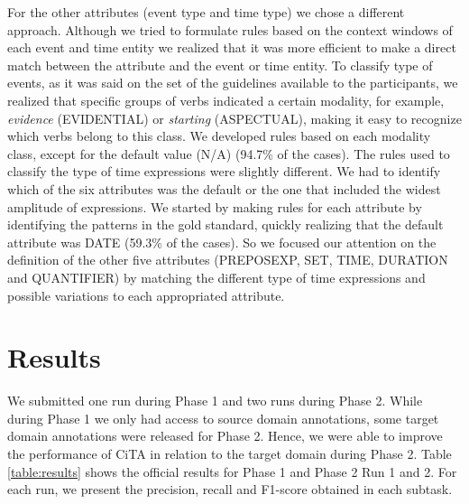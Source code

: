 \documentclass[11pt,a4paper]{article}
\begin{document}
For the other attributes (event type and time type) we chose a different approach. Although we tried to formulate rules based on the context windows of each event and time entity we realized that it was more efficient to make a direct match between the attribute and the event or time entity. 
To classify type of events, as it was said on the set of the guidelines available to the participants, we realized that specific groups of verbs indicated a certain modality, for example, \textit{evidence} (EVIDENTIAL) or \textit{starting} (ASPECTUAL), making it easy to recognize which verbs belong to this class. %
We developed rules based on each modality class, except for the default value (N/A) (94.7\% of the cases).
The rules used to classify the type of time expressions were slightly different.
We had to identify which of the six attributes was the default or the one that included the widest amplitude of expressions. 
We started by making rules for each attribute by identifying the patterns in the gold standard, quickly realizing that the default attribute was DATE (59.3\% of the cases). So we focused our attention on the definition of the other five attributes (PREPOSEXP, SET, TIME, DURATION and QUANTIFIER) by matching the different type of time expressions and possible variations to each appropriated attribute. 


\section{Results}

We submitted one run during Phase 1 and two runs during Phase 2.
While during Phase 1 we only had access to source domain annotations, some target domain annotations were released for Phase 2.
Hence, we were able to improve the performance of CiTA in relation to the target domain during Phase 2.
Table \ref{table:results} shows the official results for Phase 1 and Phase 2 Run 1 and 2.
For each run, we present the precision, recall and F1-score obtained in each subtask.


\end{document}
